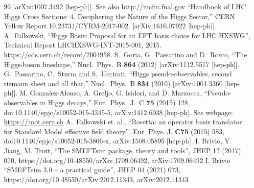 \documentclass[aps,superscriptaddress,nofootinbib]{revtex4}
\begin{document}
\begin{thebibliography}{99}
  [arXiv:1007.3492 [hep-ph]].
  See also http://mcfm.fnal.gov
``Handbook of LHC Higgs Cross Sections: 4. Deciphering the Nature of the Higgs Sector,''
CERN Yellow Report 10.23731/CYRM-2017-002.
[arXiv:1610.07922 [hep-ph]].
{A.~Falkowski, ``{Higgs Basis: Proposal for an EFT basis choice
  for LHC HXSWG}'',} Technical Report LHCHXSWG-INT-2015-001, 2015.
\newblock \url{https://cds.cern.ch/record/2001958}.
  S.~Goria, G.~Passarino and D.~Rosco,
  ``The Higgs-boson lineshape,''
  Nucl.\ Phys.\ B  {\bf 864} (2012)
  [arXiv:1112.5517 [hep-ph]].
  G.~Passarino, C.~Sturm and S.~Uccirati,
  ``Higgs pseudo-observables, second riemann sheet and all that,''
  Nucl.\ Phys.\ B {\bf 834} (2010)
  [arXiv:1001.3360 [hep-ph]].
  M. Gonzalez-Alonso, A. Greljo, G. Isidori, and D. Marzocca, ``Pseudo-observables in
  Higgs decays,'' Eur.\ Phys.\ J.\ C {\bf 75} (2015) 128,
  doi:10.1140/epjc/s10052-015-3345-5, arXiv:1412.6038 [hep-ph].
See webpage: \url{https://root.cern.ch}
A.~Falkowski {et~al.}, ``{Rosetta: an operator basis translator for Standard Model effective field theory}'',
 { Eur. Phys. J.}  {\bf C75} (2015) 583,
 doi{10.1140/epjc/s10052-015-3806-x}, arXiv:1508.05895 [hep-ph].
I. Brivio, Y. Jiang, M. Trott, ``{The SMEFTsim package, theory and tools}'', JHEP 12 (2017) 070, https://doi.org/10.48550/arXiv.1709.06492, arXiv:1709.06492
I. Brivio ``{SMEFTsim 3.0 -- a practical guide}'', JHEP 04 (2021) 073, https://doi.org/10.48550/arXiv.2012.11343, arXiv:2012.11343
\end{thebibliography}
\end{document}
